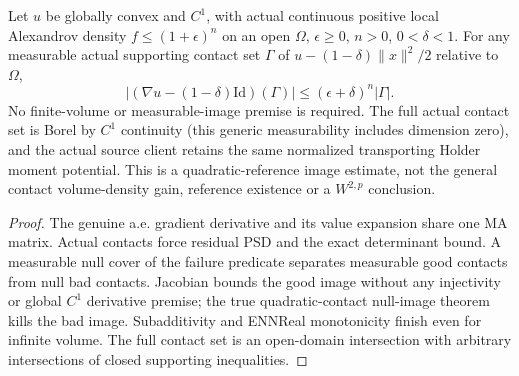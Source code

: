 \begin{lemma}
  \label{lem:convex-quadratic-contact-measure}
  \leanok
  Let $u$ be globally convex and $C^1$, with actual continuous positive local
  Alexandrov density $f\le(1+\epsilon)^n$ on an open $\Omega$, $\epsilon\ge0$,
  $n>0$, $0<\delta<1$. For any measurable actual supporting contact set $\Gamma$
  of $u-(1-\delta)\|x\|^2/2$ relative to $\Omega$,
  \[
    |(\nabla u-(1-\delta)\mathrm{Id})(\Gamma)|
       \le (\epsilon+\delta)^n |\Gamma|.
  \]
  No finite-volume or measurable-image premise is required. The full actual
  contact set is Borel by $C^1$ continuity (this generic measurability includes
  dimension zero), and the actual source client retains the same normalized
  transporting Holder moment potential. This is a quadratic-reference image
  estimate, not the general contact volume-density gain, reference existence
  or a $W^{2,p}$ conclusion.
\end{lemma}
\begin{proof}
  \leanok
  The genuine a.e. gradient derivative and its value expansion share one MA
  matrix. Actual contacts force residual PSD and the exact determinant bound.
  A measurable null cover of the failure predicate separates measurable good
  contacts from null bad contacts. Jacobian bounds the good image without any
  injectivity or global $C^1$ derivative premise; the true quadratic-contact
  null-image theorem kills the bad image. Subadditivity and ENNReal monotonicity
  finish even for infinite volume. The full contact set is an open-domain
  intersection with arbitrary intersections of closed supporting inequalities.
\end{proof}


